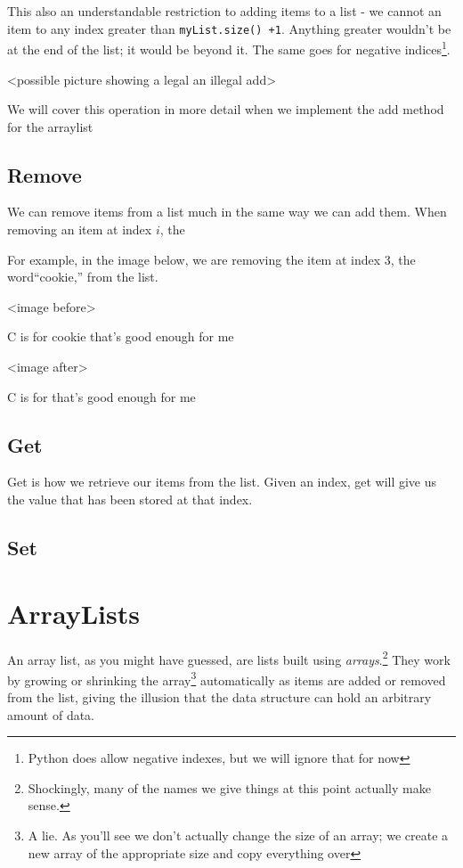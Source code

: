 This also an understandable restriction to adding items to a list -  we cannot an item to any index greater than \texttt{myList.size() +1}.   Anything greater wouldn't be at the end of the list; it would be beyond it.  The same goes for negative indices\footnote{Python does allow negative indexes, but we will ignore that for now}.
 
<possible picture showing a legal an illegal add>

We will cover this operation in more detail when we implement the add method for the arraylist 

\subsection{Remove}  We can remove items from a list much in the same way we can add them. When removing an item at index $i$, the 

For example, in the image below, we are removing the item at index 3, the word``cookie,'' from the list.


<image before>

C is for cookie that's good enough for me 

<image after>

C is for that's good enough for me 

\subsection{Get}

Get is how we retrieve our items from the list.  Given an index, get will give us the value that has been stored at that index.



\subsection{Set}

\section{ArrayLists}
An array list, as you might have guessed, are lists built using \textit{arrays}.\footnote{Shockingly, many of the names we give things at this point actually make sense.}
They work by growing or shrinking the array\footnote{A lie.  As you'll see we don't actually change the size of an array;  we create a new array of the appropriate size and copy everything over} automatically as items are added or removed from the list, giving the illusion that the data structure can hold an arbitrary amount of data.

